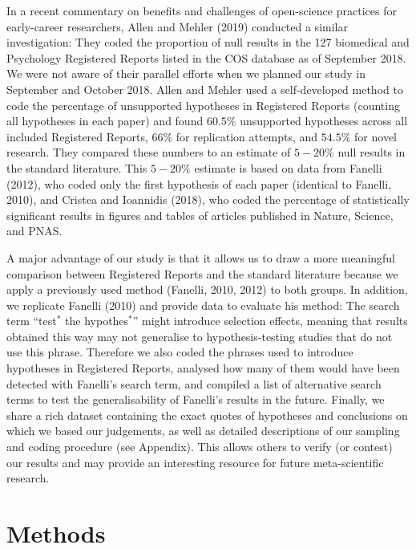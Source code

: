\documentclass[british,,jou,floatsintext]{apa6}
\begin{document}
In a recent commentary on benefits and challenges of open-science practices for early-career researchers, Allen and Mehler (2019) conducted a similar investigation:
They coded the proportion of null results in the 127 biomedical and Psychology Registered Reports listed in the COS database as of September 2018.
We were not aware of their parallel efforts when we planned our study in September and October 2018.
Allen and Mehler used a self-developed method to code the percentage of unsupported hypotheses in Registered Reports (counting all hypotheses in each paper) and found \(60.5\%\) unsupported hypotheses across all included Registered Reports, \(66\%\) for replication attempts, and \(54.5\%\) for novel research.
They compared these numbers to an estimate of \(5-20\%\) null results in the standard literature.
This \(5-20\%\) estimate is based on data from Fanelli (2012), who coded only the first hypothesis of each paper (identical to Fanelli, 2010), and Cristea and Ioannidis (2018), who coded the percentage of statistically significant results in figures and tables of articles published in Nature, Science, and PNAS.

A major advantage of our study is that it allows us to draw a more meaningful comparison between Registered Reports and the standard literature because we apply a previously used method (Fanelli, 2010, 2012) to both groups.
In addition, we replicate Fanelli (2010) and provide data to evaluate his method: The search term \enquote{test\(^\ast\) the hypothes\(^\ast\)} might introduce selection effects, meaning that results obtained this way may not generalise to hypothesis-testing studies that do not use this phrase.
Therefore we also coded the phrases used to introduce hypotheses in Registered Reports, analysed how many of them would have been detected with Fanelli's search term, and compiled a list of alternative search terms to test the generalisability of Fanelli's results in the future.
Finally, we share a rich dataset containing the exact quotes of hypotheses and conclusions on which we based our judgements, as well as detailed descriptions of our sampling and coding procedure (see Appendix).
This allows others to verify (or contest) our results and may provide an interesting resource for future meta-scientific research.

\hypertarget{methods}{%
\section{Methods}\label{methods}}
\end{document}

